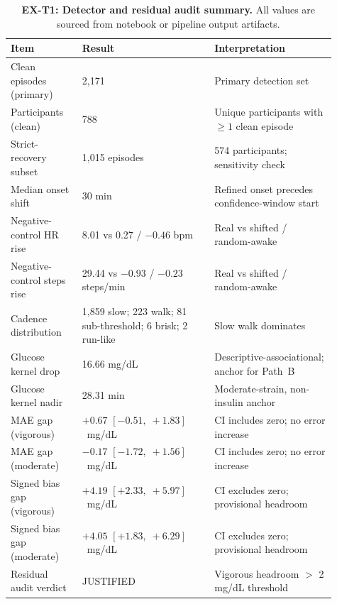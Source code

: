 \begin{table}[H]
  \centering
  \caption{%
    \textbf{EX-T1: Detector and residual audit summary.}
    All values are sourced from notebook or pipeline output artifacts.%
  }
  \label{tab:exercise_summary}
  \small
  \setlength{\tabcolsep}{3pt}
  \begin{tabular}{p{0.20\linewidth}p{0.37\linewidth}p{0.34\linewidth}}
    \toprule
    Item & Result & Interpretation \\
    \midrule
    Clean episodes (primary)    & 2{,}171           & Primary detection set \\
    Participants (clean)        & 788               & Unique participants with $\geq 1$ clean episode \\
    Strict-recovery subset      & 1{,}015 episodes  & 574 participants; sensitivity check \\
    Median onset shift          & 30 min            & Refined onset precedes confidence-window start \\
    Negative-control HR rise    & 8.01 vs 0.27 / $-0.46$ bpm & Real vs shifted / random-awake \\
    Negative-control steps rise & 29.44 vs $-0.93$ / $-0.23$ steps/min & Real vs shifted / random-awake \\
    Cadence distribution        & 1{,}859 slow; 223 walk; 81 sub-threshold; 6 brisk; 2 run-like & Slow walk dominates \\
    Glucose kernel drop         & 16.66 mg/dL & Descriptive-associational; anchor for Path~B \\
    Glucose kernel nadir        & 28.31 min & Moderate-strain, non-insulin anchor \\
    MAE gap (vigorous)          & $+0.67$ $[-0.51,\;+1.83]$~mg/dL & CI includes zero; no error increase \\
    MAE gap (moderate)          & $-0.17$ $[-1.72,\;+1.56]$~mg/dL & CI includes zero; no error increase \\
    Signed bias gap (vigorous)  & $+4.19$ $[+2.33,\;+5.97]$~mg/dL & CI excludes zero; provisional headroom \\
    Signed bias gap (moderate)  & $+4.05$ $[+1.83,\;+6.29]$~mg/dL & CI excludes zero; provisional headroom \\
    Residual audit verdict      & JUSTIFIED         & Vigorous headroom $>$ 2 mg/dL threshold \\
    \bottomrule
  \end{tabular}
\end{table}
